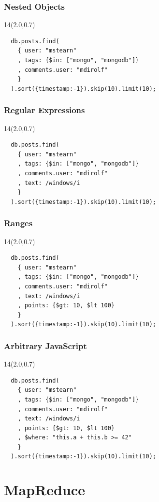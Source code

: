 \documentclass{beamer}
\newcommand{\MongoLogo}{
\begin{textblock}{14}(2.0,0.7)
  \pgfuseimage{logo}
\end{textblock}
}
\begin{document}
\begin{frame}[fragile]
  \frametitle{Nested Objects}
  \MongoLogo

  \begin{verbatim}
  db.posts.find(
    { user: "mstearn"
    , tags: {$in: ["mongo", "mongodb"]}
    , comments.user: "mdirolf"
    }
  ).sort({timestamp:-1}).skip(10).limit(10);
  \end{verbatim}
  
\end{frame}
\begin{frame}[fragile]
  \frametitle{Regular Expressions}
  \MongoLogo

  \begin{verbatim}
  db.posts.find(
    { user: "mstearn"
    , tags: {$in: ["mongo", "mongodb"]}
    , comments.user: "mdirolf"
    , text: /windows/i
    }
  ).sort({timestamp:-1}).skip(10).limit(10);
  \end{verbatim}
  
\end{frame}
\begin{frame}[fragile]
  \frametitle{Ranges}
  \MongoLogo

  \begin{verbatim}
  db.posts.find(
    { user: "mstearn"
    , tags: {$in: ["mongo", "mongodb"]}
    , comments.user: "mdirolf"
    , text: /windows/i
    , points: {$gt: 10, $lt 100}
    }
  ).sort({timestamp:-1}).skip(10).limit(10);
  \end{verbatim}
  
\end{frame}
\begin{frame}[fragile]
  \frametitle{Arbitrary JavaScript}
  \MongoLogo

  \begin{verbatim}
  db.posts.find(
    { user: "mstearn"
    , tags: {$in: ["mongo", "mongodb"]}
    , comments.user: "mdirolf"
    , text: /windows/i
    , points: {$gt: 10, $lt 100}
    , $where: "this.a + this.b >= 42"
    }
  ).sort({timestamp:-1}).skip(10).limit(10);
  \end{verbatim}
\end{frame}


\section{MapReduce}
\end{document}
